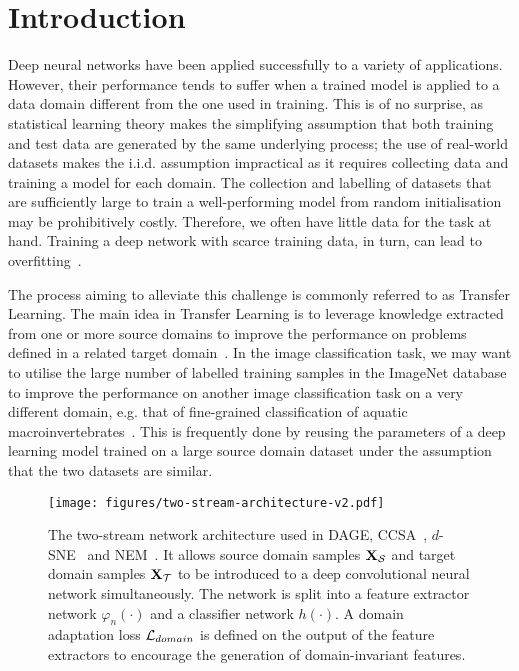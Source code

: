 \documentclass[journal]{IEEEtran}
\renewcommand{\matrix}[1]{\ensuremath{\bm{\mathbf{\uppercase{#1}}}}}
\newcommand{\mX}{\matrix{x}}
\newcommand{\Src}{\mathcal{S}} \newcommand{\Tgt}{\mathcal{T}}
\begin{document}
 





\maketitle


\section{Introduction} \label{sec:introduction}

Deep neural networks have been applied successfully to a variety of applications. However, their performance tends to suffer when a trained model is applied to a data domain different from the one used in training. This is of no surprise, as statistical learning theory makes the simplifying assumption that both training and test data are generated by the same underlying process; the use of real-world datasets makes the i.i.d. assumption impractical as it requires collecting data and training a model for each domain. The collection and labelling of datasets that are sufficiently large to train a well-performing model from random initialisation may be prohibitively costly. Therefore, we often have little data for the task at hand. Training a deep network with scarce training data, in turn, can lead to overfitting~\cite{arpit2017closer}. 

The process aiming to alleviate this challenge is commonly referred to as Transfer Learning. The main idea in Transfer Learning is to leverage knowledge extracted from one or more source domains to improve the performance on problems defined in a related target domain~\cite{pan2010survey, weiss2016survey, torrey2010transfer}. In the image classification task, we may want to utilise the large number of labelled training samples in the ImageNet database to improve the performance on another image classification task on a very different domain, e.g. that of fine-grained classification of aquatic macroinvertebrates~\cite{raitoharju2016data}. This is frequently done by reusing the parameters of a deep learning model trained on a large source domain dataset under the assumption that the two datasets are similar. 

\begin{figure}[!t]
    \centering
    \texttt{[image: figures/two-stream-architecture-v2.pdf]}
    \caption{The two-stream network architecture used in DAGE, CCSA~\cite{motiian2017ccsa}, $d$-SNE~\cite{xu2019dsne} and NEM~\cite{wang2019nem}. It allows source domain samples $\mX_\Src$ and target domain samples $\mX_\Tgt$ to be introduced to a deep convolutional neural network simultaneously. The network is split into a feature extractor network $\varphi_n(\cdot)$ and a classifier network $h(\cdot)$. A domain adaptation loss $\concept{L}_{domain}$ is defined on the output of the feature extractors to encourage the generation of domain-invariant features.
    }
    \label{fig:two-stream-architecture}
\end{figure}
\end{document}
